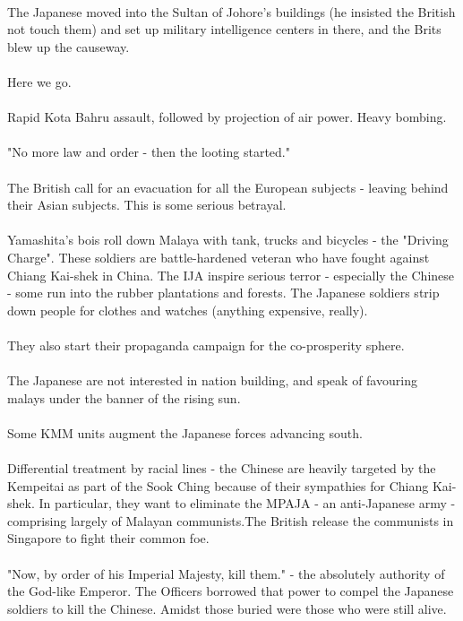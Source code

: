 \documentclass[a4paper]{article}
\begin{document}
\\
The Japanese moved into the Sultan of Johore's buildings (he insisted the British not touch them) and set up military intelligence centers in there, and the Brits blew up the causeway.\\
\\
Here we go.\\
\\
Rapid Kota Bahru assault, followed by projection of air power. Heavy bombing.\\
\\
"No more law and order - then the looting started."\\
\\
The British call for an evacuation for all the European subjects - leaving behind their Asian subjects. This is some serious betrayal.\\
\\
Yamashita's bois roll down Malaya with tank, trucks and bicycles - the "Driving Charge". These soldiers are battle-hardened veteran who have fought against Chiang Kai-shek in China. The IJA inspire serious terror - especially the Chinese - some run into the rubber plantations and forests. The Japanese soldiers strip down people for clothes and watches (anything expensive, really).\\
\\
They also start their propaganda campaign for the co-prosperity sphere.\\
\\
The Japanese are not interested in nation building, and speak of favouring malays under the banner of the rising sun.\\
\\
Some KMM units augment the Japanese forces advancing south.\\
\\
Differential treatment by racial lines - the Chinese are heavily targeted by the Kempeitai as part of the Sook Ching because of their sympathies for Chiang Kai-shek. In particular, they want to eliminate the MPAJA - an anti-Japanese army - comprising largely of Malayan communists.The British release the communists in Singapore to fight their common foe.\\
\\
"Now, by order of his Imperial Majesty, kill them." - the absolutely authority of the God-like Emperor. The Officers borrowed that power to compel the Japanese soldiers to kill the Chinese. Amidst those buried were those who were still alive.\\
\end{document}
